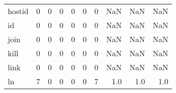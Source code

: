 \begin{tabular}{lrrrrrrrrr}
hostid    &                                                  0 &                                                  0 &                                                  0 &                                                  0 &                                                  0 &                                                  0 &                                                NaN &                                    NaN &                                  NaN \\
id        &                                                  0 &                                                  0 &                                                  0 &                                                  0 &                                                  0 &                                                  0 &                                                NaN &                                    NaN &                                  NaN \\
join      &                                                  0 &                                                  0 &                                                  0 &                                                  0 &                                                  0 &                                                  0 &                                                NaN &                                    NaN &                                  NaN \\
kill      &                                                  0 &                                                  0 &                                                  0 &                                                  0 &                                                  0 &                                                  0 &                                                NaN &                                    NaN &                                  NaN \\
link      &                                                  0 &                                                  0 &                                                  0 &                                                  0 &                                                  0 &                                                  0 &                                                NaN &                                    NaN &                                  NaN \\
ln        &                                                  7 &                                                  0 &                                                  0 &                                                  0 &                                                  0 &                                                  7 &                                                1.0 &                                    1.0 &                                  1.0 \\

\end{tabular}
